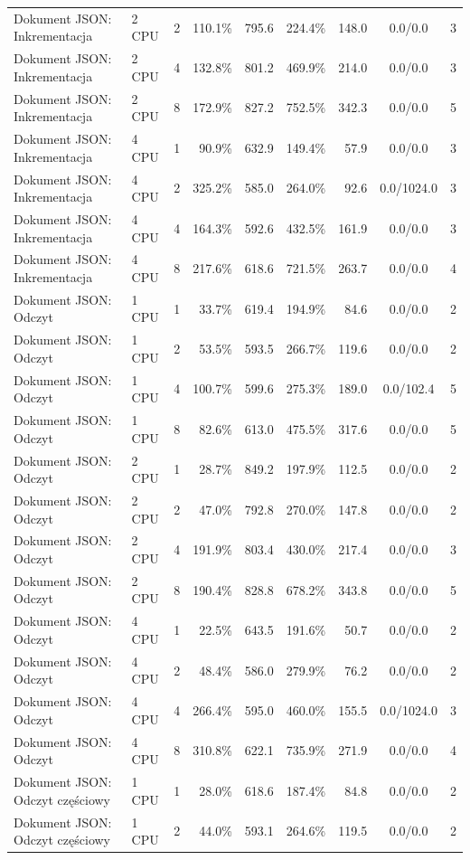 \begin{table}[ht]
{\begin{tabular}{llcrrrrcc}
Dokument JSON: Inkrementacja & 2 CPU & 2 & 110.1\% & 795.6 & 224.4\% & 148.0 & 0.0/0.0 & 3 \\
Dokument JSON: Inkrementacja & 2 CPU & 4 & 132.8\% & 801.2 & 469.9\% & 214.0 & 0.0/0.0 & 3 \\
Dokument JSON: Inkrementacja & 2 CPU & 8 & 172.9\% & 827.2 & 752.5\% & 342.3 & 0.0/0.0 & 5 \\
Dokument JSON: Inkrementacja & 4 CPU & 1 & 90.9\% & 632.9 & 149.4\% & 57.9 & 0.0/0.0 & 3 \\
Dokument JSON: Inkrementacja & 4 CPU & 2 & 325.2\% & 585.0 & 264.0\% & 92.6 & 0.0/1024.0 & 3 \\
Dokument JSON: Inkrementacja & 4 CPU & 4 & 164.3\% & 592.6 & 432.5\% & 161.9 & 0.0/0.0 & 3 \\
Dokument JSON: Inkrementacja & 4 CPU & 8 & 217.6\% & 618.6 & 721.5\% & 263.7 & 0.0/0.0 & 4 \\
Dokument JSON: Odczyt & 1 CPU & 1 & 33.7\% & 619.4 & 194.9\% & 84.6 & 0.0/0.0 & 2 \\
Dokument JSON: Odczyt & 1 CPU & 2 & 53.5\% & 593.5 & 266.7\% & 119.6 & 0.0/0.0 & 2 \\
Dokument JSON: Odczyt & 1 CPU & 4 & 100.7\% & 599.6 & 275.3\% & 189.0 & 0.0/102.4 & 5 \\
Dokument JSON: Odczyt & 1 CPU & 8 & 82.6\% & 613.0 & 475.5\% & 317.6 & 0.0/0.0 & 5 \\
Dokument JSON: Odczyt & 2 CPU & 1 & 28.7\% & 849.2 & 197.9\% & 112.5 & 0.0/0.0 & 2 \\
Dokument JSON: Odczyt & 2 CPU & 2 & 47.0\% & 792.8 & 270.0\% & 147.8 & 0.0/0.0 & 2 \\
Dokument JSON: Odczyt & 2 CPU & 4 & 191.9\% & 803.4 & 430.0\% & 217.4 & 0.0/0.0 & 3 \\
Dokument JSON: Odczyt & 2 CPU & 8 & 190.4\% & 828.8 & 678.2\% & 343.8 & 0.0/0.0 & 5 \\
Dokument JSON: Odczyt & 4 CPU & 1 & 22.5\% & 643.5 & 191.6\% & 50.7 & 0.0/0.0 & 2 \\
Dokument JSON: Odczyt & 4 CPU & 2 & 48.4\% & 586.0 & 279.9\% & 76.2 & 0.0/0.0 & 2 \\
Dokument JSON: Odczyt & 4 CPU & 4 & 266.4\% & 595.0 & 460.0\% & 155.5 & 0.0/1024.0 & 3 \\
Dokument JSON: Odczyt & 4 CPU & 8 & 310.8\% & 622.1 & 735.9\% & 271.9 & 0.0/0.0 & 4 \\
Dokument JSON: Odczyt częściowy & 1 CPU & 1 & 28.0\% & 618.6 & 187.4\% & 84.8 & 0.0/0.0 & 2 \\
Dokument JSON: Odczyt częściowy & 1 CPU & 2 & 44.0\% & 593.1 & 264.6\% & 119.5 & 0.0/0.0 & 2 \\

\end{tabular}}
\end{table}
